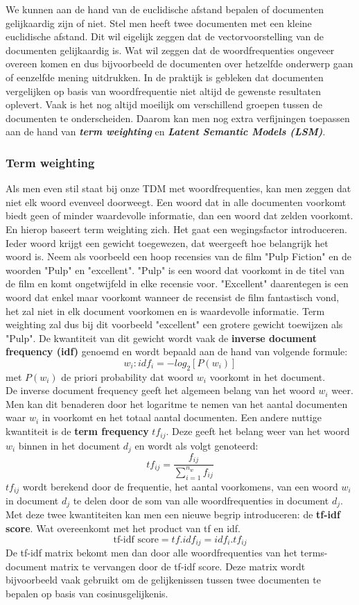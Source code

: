 We kunnen aan de hand van de euclidische afstand bepalen of documenten gelijkaardig zijn of niet. Stel men heeft twee documenten met een kleine euclidische afstand. Dit wil eigelijk zeggen dat de vectorvoorstelling van de documenten gelijkaardig is. Wat wil zeggen dat de woordfrequenties ongeveer overeen komen en dus bijvoorbeeld de documenten over hetzelfde onderwerp gaan of eenzelfde mening uitdrukken.
%
In de praktijk is gebleken dat documenten vergelijken op basis van woordfrequentie niet altijd de gewenste resultaten oplevert. Vaak is het nog altijd moeilijk om verschillend groepen tussen de documenten te onderscheiden. Daarom kan men nog extra verfijningen toepassen aan de hand van \textbf{\textit{term weighting}} en \textbf{\textit{Latent Semantic Models (LSM)}}.


\subsubsection{Term weighting}\label{Term weighting}

Als men even stil staat bij onze TDM met woordfrequenties, kan men zeggen dat niet elk woord evenveel doorweegt. Een woord dat in alle documenten voorkomt biedt geen of minder waardevolle informatie, dan een woord dat zelden voorkomt. En hierop baseert term weighting zich. Het gaat een wegingsfactor introduceren. Ieder woord krijgt een gewicht toegewezen, dat weergeeft hoe belangrijk het woord is. Neem als voorbeeld een hoop recensies van de film "Pulp Fiction" en de woorden "Pulp" en "excellent". "Pulp" is een woord dat voorkomt in de titel van de film en komt ongetwijfeld in elke recensie voor. "Excellent" daarentegen is een woord dat enkel maar voorkomt wanneer de recensist de film fantastisch vond, het zal niet in elk document voorkomen en is waardevolle informatie. Term weighting zal dus bij dit voorbeeld "excellent" een grotere gewicht toewijzen als "Pulp". 
%
De kwantiteit van dit gewicht wordt vaak de \textbf{inverse document frequency  (idf)} genoemd en wordt bepaald aan de hand van volgende formule:
\[w_{i}: idf_{i} = -log_{2}[P(w_{i})] \]
met $P(w_{i})$ de priori probability dat woord $w_{i}$ voorkomt in het document.\\
%
De inverse document frequency geeft het algemeen belang van het woord $w_{i}$ weer. Men kan dit benaderen door het logaritme te nemen van het aantal documenten waar $w_{i}$ in voorkomt en het totaal aantal documenten.
Een andere nuttige kwantiteit is de  \textbf{term frequency} $tf_{ij}$. Deze geeft het belang weer van het woord $w_{i}$ binnen in het document $d_{j}$  en wordt als volgt genoteerd:
\[ tf_{ij} = \frac{f_{ij}}{ \sum_{i=1}^{n_{w}}f_{ij}} \]
%
$tf_{ij}$ wordt berekend door de frequentie, het aantal voorkomens, van een woord $w_{i}$ in document $d_{j}$ te delen door de som van alle woordfrequenties in document $d_{j}$.
Met deze twee kwantiteiten kan men een nieuwe begrip introduceren: de \textbf{tf-idf score}. Wat overeenkomt met het product van tf en idf.
\[ \text{tf-idf score} = tf . idf_{ij} = idf_{i} . tf_{ij} \]
%
De tf-idf matrix bekomt men dan door alle woordfrequenties van het terms-document matrix te vervangen door de tf-idf score.
Deze matrix wordt bijvoorbeeld vaak gebruikt om de gelijkenissen tussen twee documenten te bepalen op basis van cosinusgelijkenis.
%
